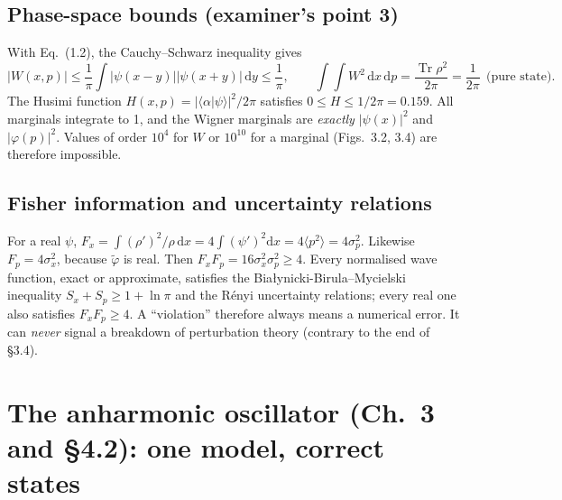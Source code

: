 \documentclass[11pt,a4paper]{article}
\newcommand{\Eq}[1]{Eq.~(#1)}
\newcommand{\dd}{\mathrm{d}}
\begin{document}
\subsection{Phase-space bounds (examiner's point 3)}
With \Eq{1.2}, the Cauchy--Schwarz inequality gives
\begin{equation}
|W(x,p)|\le\frac1\pi\int|\psi(x-y)||\psi(x+y)|\,\dd y\le\frac1\pi,\qquad
\int\!\!\int W^2\,\dd x\,\dd p=\frac{\operatorname{Tr}\rho^2}{2\pi}=\frac1{2\pi}\ \ \text{(pure state)}.
\label{eq:Wbound}
\end{equation}
The Husimi function $H(x,p)=|\langle\alpha|\psi\rangle|^2/2\pi$ satisfies
$0\le H\le1/2\pi=0.159$. All marginals integrate to 1, and the Wigner marginals are
\emph{exactly} $|\psi(x)|^2$ and $|\varphi(p)|^2$. Values of order $10^4$ for $W$ or $10^{10}$ for
a marginal (Figs.~3.2, 3.4) are therefore impossible.

\subsection{Fisher information and uncertainty relations}
For a real $\psi$, $F_x=\int(\rho')^2/\rho\,\dd x=4\int(\psi')^2\dd x=4\langle p^2\rangle=4\sigma_p^2$.
Likewise $F_p=4\sigma_x^2$, because $\tilde\varphi$ is real. Then $F_xF_p=16\sigma_x^2\sigma_p^2\ge4$.
Every normalised wave function, exact or approximate, satisfies the
Bia{\l}ynicki-Birula--Mycielski inequality $S_x+S_p\ge1+\ln\pi$ and the Rényi uncertainty
relations; every real one also satisfies $F_xF_p\ge4$. A ``violation'' therefore always means a numerical error. It can
\emph{never} signal a breakdown of perturbation theory (contrary to the end of \S3.4).

\section{The anharmonic oscillator (Ch.~3 and \S4.2): one model, correct states}
\label{sec:aho}
\end{document}
